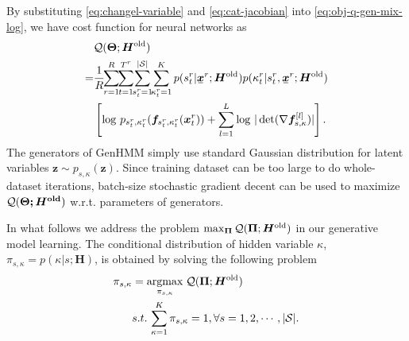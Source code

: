 \documentclass[letterpaper]{article} %
\newcommand{\ubar}[1]{\mkern2mu\underline{\mkern-2mu #1\mkern-2mu}\mkern2mu}
\newcommand{\ubmr}[2]{\ubar{\bm{#1}}^{#2}}
\newcommand{\bmtr}[3]{\bm{#1}^{#3}_{#2}}
\newcommand{\smtr}[3]{{#1}^{#3}_{#2}}
\begin{document}
By substituting \eqref{eq:changel-variable} and \eqref{eq:cat-jacobian} into \eqref{eq:obj-q-gen-mix-log}, we have cost function for neural networks as
\begin{align}\label{eq:obj-q-gen-mix}
  &\Qq(\bm{\Theta}; \bm{H}^{\mathrm{old}}) \nonumber \\
  =& \frac{1}{R}\hspace{-3pt}\sum_{r=1}^{R}\hspace{-3pt} \sum_{t=1}^{{T}^{r}}\hspace{-3pt} \sum_{\smtr{s}{t}{r}=1}^{|\Ss|} \hspace{-3pt} \sum_{\smtr{\kappa}{t}{r}=1}^{K}p(\smtr{s}{t}{r}| \ubmr{x}{r}; \bm{H}^{\mathrm{old}})p(\smtr{\kappa}{t}{r}|\smtr{s}{t}{r}, \ubmr{x}{r}; \bm{H}^{\mathrm{old}}) \nonumber\\
  &\left[ \log\, p_{\smtr{s}{t}{r}, \smtr{\kappa}{t}{r}}(\bm{f}_{\smtr{s}{t}{r}, \smtr{\kappa}{t}{r}}(\bmtr{x}{t}{r})) + \sum_{l=1}^{L}\log\,| \det (\nabla{\bm{f}_{s,\kappa}^{[l]}})|\right].
\end{align}
The generators of GenHMM simply use standard Gaussian distribution for latent variables $\bm{z} \sim p_{s,\kappa}(\bm{z})$. Since training dataset can be too large to do whole-dataset iterations, batch-size stochastic gradient decent can be used to maximize $\mathcal{Q}(\bm{\Theta; \bm{H}^{\mathrm{old}}})$ w.r.t. parameters of generators.

In what follows we address the problem $\max_{\bm{\Pi}} \mathcal{Q}(\bm{\Pi}; \bm{H}^{\mathrm{old}})$ in our generative model learning. The conditional distribution of hidden variable $\kappa$, $\pi_{s, \kappa} = p(\kappa | s; \bm{H})$, is obtained by solving the following problem
\begin{align}\label{opm:pi}
  \pi_{s, \kappa} & = \underset{\pi_{s, \kappa}}{\operatorname{argmax}}\; \mathcal{Q}(\bm{\Pi}; \bm{H}^{\mathrm{old}}) \\ \nonumber
                  & s.t. \, \sum_{\kappa=1}^{K} \pi_{s, \kappa}= 1, \forall s = 1, 2, \cdots, |\mathcal{S}|. 
\end{align}
\end{document}
